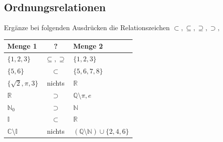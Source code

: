 \documentclass[11pt, a4paper]{article}
\begin{document}
\subsection{Ordnungsrelationen}
Ergänze bei folgenden Ausdrücken die Relationszeichen $\subset, \subseteq, \supseteq, \supset,$ \\
\begin{tabular}{|l|c|l|}
	\hline
	Menge 1 & \hspace{3mm} ? \hspace{3mm} & Menge 2 \\ \hline
	$\{1,2,3\}$ & $\subseteq, \supseteq$ & $\{1,2,3\}$ \\
	$\{5,6\}$ & $\subset$ & $\{5,6,7,8\}$ \\
	$\{\sqrt{2}, \pi, 3\}$ & nichts & $\mathbb{R}$ \\
	$\mathbb{R}$ & $\supset$ & $\mathbb{Q} \setminus {\pi, e}$ \\
	$\mathbb{N}_0$ & $\supset$ & $\mathbb{N}$ \\
	$\mathbb{I}$ & $\subset$ & $\mathbb{R}$ \\
	$\mathbb{C} \setminus \mathbb{I}$ & nichts & $\left(\mathbb{Q} \setminus \mathbb{N}\right) \cup \{2,4,6\}$ \\ \hline
\end{tabular}
\end{document}
